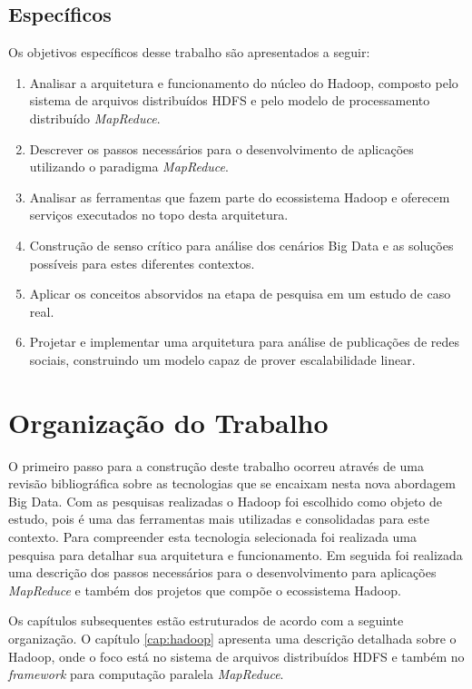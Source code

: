 \subsection{Específicos}
 
Os objetivos específicos desse trabalho são apresentados a seguir:
 
\begin{enumerate}
  \item Analisar a arquitetura e funcionamento do núcleo do Hadoop, composto pelo sistema de arquivos distribuídos HDFS e pelo modelo de processamento distribuído \textit{MapReduce}.
  \item Descrever os passos necessários para o desenvolvimento de aplicações utilizando o paradigma \textit{MapReduce}.
  \item Analisar as ferramentas que fazem parte do ecossistema Hadoop e oferecem serviços executados no topo desta arquitetura.
  \item Construção de senso crítico para análise dos cenários Big Data e as soluções possíveis para estes diferentes contextos.
  \item Aplicar os conceitos absorvidos na etapa de pesquisa em um estudo de caso real.
  \item Projetar e implementar uma arquitetura para análise de publicações de redes sociais, construindo um modelo capaz de prover escalabilidade linear.

\end{enumerate}
 
 
\section{Organização do Trabalho}
 
O primeiro passo para a construção deste trabalho ocorreu através de uma revisão bibliográfica sobre as tecnologias que se encaixam nesta nova abordagem Big Data. Com as pesquisas realizadas o Hadoop foi escolhido como objeto de estudo, pois é uma das ferramentas mais utilizadas e consolidadas para este contexto. Para compreender esta tecnologia selecionada foi realizada uma pesquisa para detalhar sua arquitetura e funcionamento. Em seguida foi realizada uma descrição dos passos necessários para o desenvolvimento para aplicações \textit{MapReduce} e também dos projetos que compõe o ecossistema Hadoop.

Os capítulos subsequentes estão estruturados de acordo com a seguinte organização. O capítulo \ref{cap:hadoop} apresenta uma descrição detalhada sobre o Hadoop, onde o foco está no sistema de arquivos distribuídos HDFS e também no \textit{framework} para computação paralela \textit{MapReduce}. 

